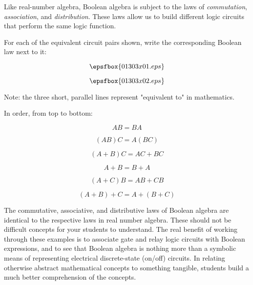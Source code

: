 

Like real-number algebra, Boolean algebra is subject to the laws of {\it commutation}, {\it association}, and {\it distribution}.  These laws allow us to build different logic circuits that perform the same logic function.

For each of the equivalent circuit pairs shown, write the corresponding Boolean law next to it:

$$\epsfbox{01303x01.eps}$$

$$\epsfbox{01303x02.eps}$$

Note: the three short, parallel lines represent "equivalent to" in mathematics.







In order, from top to bottom:

$$AB = BA$$

$$(AB)C = A(BC)$$

$$(A+B)C = AC + BC$$

$$A+B = B+A$$

$$(A+C)B = AB + CB$$

$$(A+B)+C = A+(B+C)$$







The commutative, associative, and distributive laws of Boolean algebra are identical to the respective laws in real number algebra.  These should not be difficult concepts for your students to understand.  The real benefit of working through these examples is to associate gate and relay logic circuits with Boolean expressions, and to see that Boolean algebra is nothing more than a symbolic means of representing electrical discrete-state (on/off) circuits.  In relating otherwise abstract mathematical concepts to something tangible, students build a much better comprehension of the concepts.




